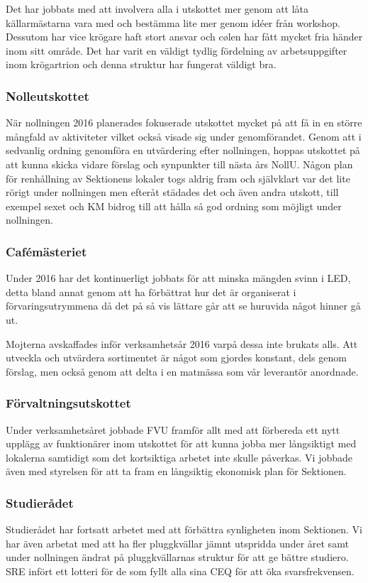 \documentclass[../_main/handlingar.tex]{subfiles}
\begin{document}
Det har jobbats med att involvera alla i utskottet mer genom att låta källarmästarna vara med och bestämma lite mer genom idéer från workshop. Dessutom har vice krögare haft stort ansvar och cølen har fått mycket fria händer inom sitt område. Det har varit en väldigt tydlig fördelning av arbetsuppgifter inom krögartrion och denna struktur har fungerat väldigt bra.

\subsubsection*{Nolleutskottet}
När nollningen 2016 planerades fokuserade utskottet mycket på att få in en större mångfald av aktiviteter vilket också visade sig under genomförandet. Genom att i sedvanlig ordning genomföra en utvärdering efter nollningen, hoppas utskottet på att kunna skicka vidare förslag och synpunkter till nästa års NollU. Någon plan för renhållning av Sektionens lokaler togs aldrig fram och självklart var det lite rörigt under nollningen men efteråt städades det och även andra utskott, till exempel sexet och KM bidrog till att hålla så god ordning som möjligt under nollningen.
\newpage
\subsubsection*{Cafémästeriet}
Under 2016 har det kontinuerligt jobbats för att minska mängden svinn i LED, detta bland annat genom att ha förbättrat hur det är organiserat i förvaringsutrymmena då det på så vis lättare går att se huruvida något hinner gå ut.

Mojterna avskaffades inför verksamhetsår 2016 varpå dessa inte brukats alls.
Att utveckla och utvärdera sortimentet är något som gjordes konstant, dels genom förslag, men också genom att delta i en matmässa som vår leverantör anordnade.

\subsubsection*{Förvaltningsutskottet}
Under verksamhetsåret jobbade FVU framför allt med att förbereda ett nytt upplägg av funktionärer inom utskottet för att kunna jobba mer långsiktigt med lokalerna samtidigt som det kortsiktiga arbetet inte skulle påverkas. Vi jobbade även med styrelsen för att ta fram en långsiktig ekonomisk plan för Sektionen.

\subsubsection*{Studierådet}
Studierådet har fortsatt arbetet med att förbättra synligheten inom Sektionen. Vi har även arbetat med att ha fler pluggkvällar jämnt utspridda under året samt under nollningen ändrat på pluggkvällarnas struktur för att ge bättre studiero. SRE infört ett lotteri för de som fyllt alla sina CEQ för att öka svarsfrekvensen.
\end{document}
